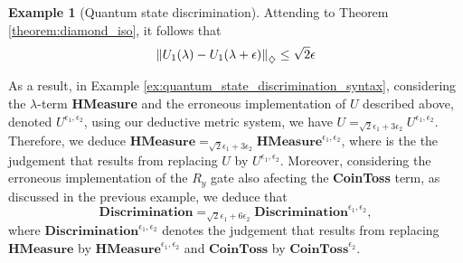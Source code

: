 \documentclass[10pt,a4paper]{amsart}
\theoremstyle{definition}
\theoremstyle{definition}
\newtheorem{example}[definition]{Example}
\theoremstyle{definition}
\theoremstyle{definition}
\theoremstyle{definition}
\theoremstyle{definition}
\begin{document}
\begin{example}[Quantum state discrimination]
Attending to Theorem \ref{theorem:diamond_iso}, it follows that
  \begin{align*}
    \left\lVert U_1(\lambda)- U_1(\lambda + \epsilon)  \right\rVert_{\diamondsuit} \leq \sqrt{2} \epsilon
  \end{align*}


As a result, in  Example \ref{ex:quantum_state_discrimination_syntax}, considering the $\lambda$-term \textbf{HMeasure} and the erroneous implementation of $U$ described above, denoted $U^{\epsilon_1, \epsilon_2}$, using our deductive metric system, we have $U =_{\sqrt{2}\epsilon_1+ 3\epsilon_2} U^{\epsilon_1, \epsilon_2}$. Therefore, we deduce $\textbf{HMeasure} =_{\sqrt{2}\epsilon_1+ 3\epsilon_2} \textbf{HMeasure}^{\epsilon_1, \epsilon_2}$, where is the the judgement that results from replacing $U$ by $U^{\epsilon_1, \epsilon_2}$. Moreover, considering the erroneous implementation of the $R_y$ gate also afecting the \textbf{CoinToss} term, as discussed in the previous example, we deduce that 
$$\textbf{Discrimination} =_{\sqrt{2}\epsilon_1+6\epsilon_2} \textbf{Discrimination}^{\epsilon_1,\epsilon_2}, $$
where $\textbf{Discrimination}^{\epsilon_1,\epsilon_2}$ denotes the judgement that results from replacing $\textbf{HMeasure}$ by $\textbf{HMeasure}^{\epsilon_1, \epsilon_2}$ and $\textbf{CoinToss}$ by  $\textbf{CoinToss}^{\epsilon_2}$.

\end{example}
\end{document}
